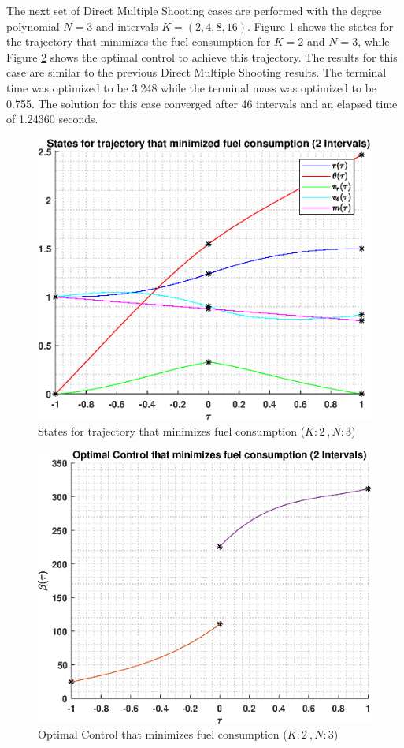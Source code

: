 \documentclass[]{article}
\begin{document}
The next set of Direct Multiple Shooting cases are performed with the degree polynomial \(N = 3\) and intervals \(K = (2,4,8,16)\). Figure \ref{fig:directStatesK2Poly3} shows the states for the trajectory that minimizes the fuel consumption for \(K = 2\) and  \(N = 3\), while Figure \ref{fig:directControlK2Poly3} shows the optimal control to achieve this trajectory. The results for this case are similar to the previous Direct Multiple Shooting results. The terminal time was optimized to be 3.248 while the terminal mass was optimized to be 0.755. The solution for this case converged after 46 intervals and an elapsed time of 1.24360 seconds.
\begin{figure}
	\centering
	\includegraphics[scale=0.75]{directStatesK2Poly3.eps}
	\caption{States for trajectory that minimizes fuel consumption (\(K:2\ , N:3\))}
	\label{fig:directStatesK2Poly3}
\end{figure}
\begin{figure}
	\centering
	\includegraphics[scale=0.75]{directControlK2Poly3.eps}
	\caption{Optimal Control that minimizes fuel consumption (\(K:2\ , N:3\))}
	\label{fig:directControlK2Poly3}
\end{figure}
\FloatBarrier
\end{document}
